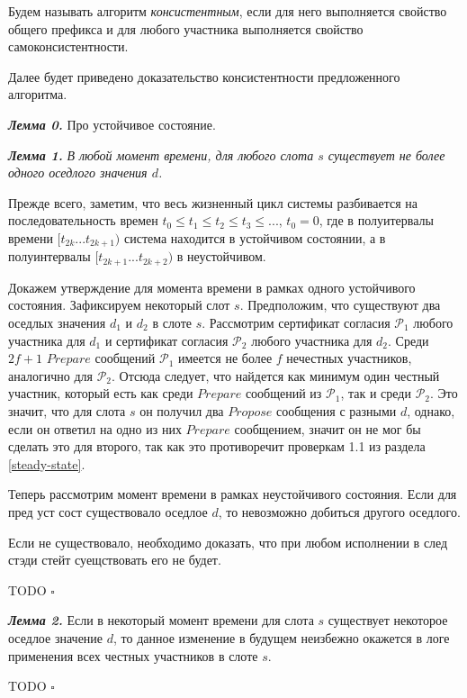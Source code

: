 Будем называть алгоритм \textit{консистентным}, если для него выполняется свойство общего префикса и для любого участника выполняется свойство самоконсистентности.
 
Далее будет приведено доказательство консистентности предложенного алгоритма.

\textbf{\textit{Лемма 0.}} Про устойчивое состояние.

\textbf{\textit{Лемма 1.}} \textit{В любой момент времени, для любого слота $s$ существует не более одного оседлого значения $d$.}

Прежде всего, заметим, что весь жизненный цикл системы разбивается на последовательность времен
$t_0 \le t_1 \le t_2 \le t_3 \le ...$, $t_0=0$, где в полуитервалы времени $[t_{2k}...t_{2k+1})$ система находится в устойчивом состоянии, а в полуинтервалы $[t_{2k+1}...t_{2k+2})$ в неустойчивом.

Докажем утверждение для момента времени в рамках одного устойчивого состояния.
Зафиксируем некоторый слот $s$. Предположим, что существуют два оседлых значения $d_1$ и $d_2$ в слоте $s$. Рассмотрим сертификат согласия $\mathcal{P}_1$ любого участника для $d_1$ и сертификат согласия $\mathcal{P}_2$ любого участника для $d_2$. Среди $2f+1$ $Prepare$ сообщений $\mathcal{P}_1$ имеется не более $f$ нечестных участников, аналогично для $\mathcal{P}_2$. Отсюда следует, что найдется как минимум один честный участник, который есть как среди $Prepare$ сообщений из $\mathcal{P}_1$, так и среди $\mathcal{P}_2$. Это значит, что для слота $s$ он получил два $Propose$ сообщения с разными $d$, однако, если он ответил на одно из них $Prepare$ сообщением, значит он не мог бы сделать это для второго, так как это противоречит проверкам 1.1 из раздела \ref{steady-state}.

Теперь рассмотрим момент времени в рамках неустойчивого состояния. 
Если для пред уст сост существовало оседлое $d$, то невозможно добиться другого оседлого.

Если не существовало, необходимо доказать, что при любом исполнении в след стэди стейт суещствовать его не будет.

TODO $\square$

\textbf{\textit{Лемма 2.}} Если в некоторый момент времени для слота $s$ существует некоторое оседлое значение $d$, то данное изменение в будущем неизбежно окажется в логе применения всех честных участников в слоте $s$.

TODO $\square$

\vspace{10pt}

